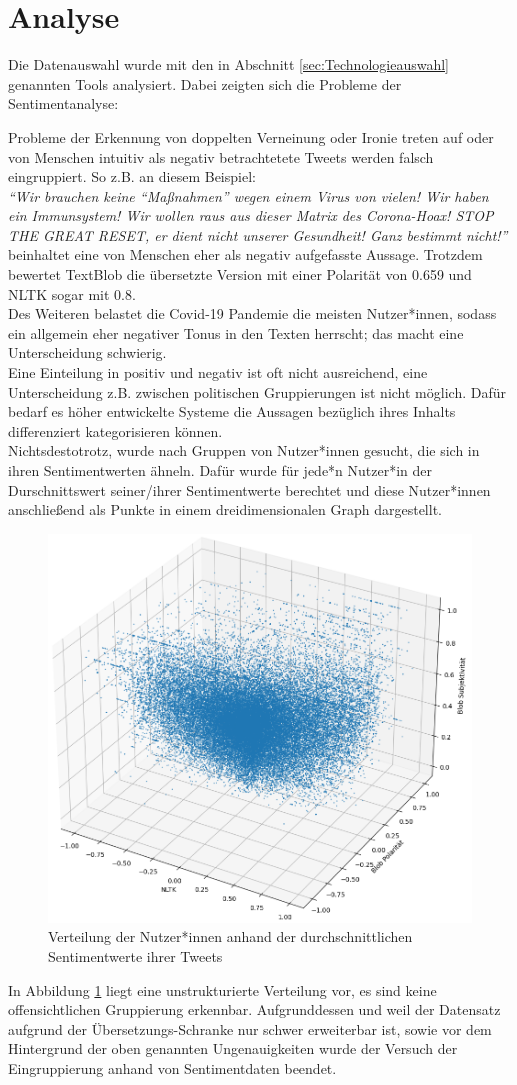 \section{Analyse}
\label{sentiment-daten-analyse}
Die Datenauswahl wurde mit den in Abschnitt \ref{sec:Technologieauswahl} genannten Tools analysiert. Dabei zeigten sich die Probleme der Sentimentanalyse:

Probleme der Erkennung von doppelten Verneinung oder Ironie treten auf oder von Menschen intuitiv als negativ betrachtetete Tweets werden falsch eingruppiert.
So z.B. an diesem Beispiel:\\
\textit{"`Wir brauchen keine "`Maßnahmen"' wegen einem Virus von vielen! Wir haben ein Immunsystem! Wir wollen raus aus dieser Matrix des Corona-Hoax! STOP THE GREAT RESET, er dient nicht unserer Gesundheit! Ganz bestimmt nicht!"'}\cite{negativ-tweet} \\beinhaltet eine von Menschen eher als negativ aufgefasste Aussage. Trotzdem bewertet TextBlob die übersetzte Version mit einer Polarität von 0.659 und NLTK sogar mit 0.8. \\
Des Weiteren belastet die Covid-19 Pandemie  die meisten Nutzer*innen, sodass ein allgemein eher negativer Tonus in den Texten herrscht; das macht eine Unterscheidung schwierig.\\ \newline
Eine Einteilung in positiv und negativ ist oft nicht ausreichend, eine Unterscheidung z.B. zwischen politischen Gruppierungen ist nicht möglich.
Dafür bedarf es höher entwickelte Systeme die Aussagen bezüglich ihres Inhalts differenziert kategorisieren können.\\
Nichtsdestotrotz, wurde nach Gruppen von Nutzer*innen gesucht, die sich in ihren Sentimentwerten ähneln. 
Dafür wurde für jede*n Nutzer*in der Durschnittswert seiner/ihrer Sentimentwerte berechtet und diese Nutzer*innen anschließend als Punkte in einem dreidimensionalen Graph dargestellt.
\begin{figure}[h!]
	\centering
	\includegraphics[width=0.5\linewidth]{images/SentimentPlot}
	\caption{Verteilung der Nutzer*innen anhand der durchschnittlichen Sentimentwerte ihrer Tweets}
	\label{fig:sentimentplot}
\end{figure}
In Abbildung \ref{fig:sentimentplot}  liegt eine unstrukturierte Verteilung vor, es sind keine offensichtlichen Gruppierung erkennbar.
Aufgrunddessen und weil der Datensatz aufgrund der Übersetzungs-Schranke nur schwer erweiterbar ist, sowie vor dem Hintergrund der oben genannten Ungenauigkeiten wurde der Versuch der Eingruppierung anhand von Sentimentdaten beendet.
